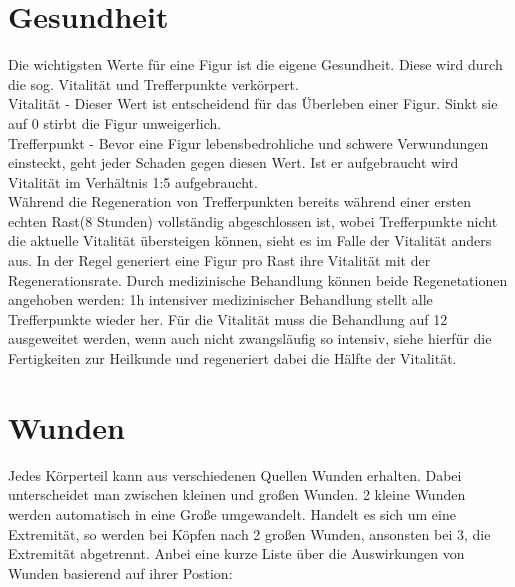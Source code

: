 \documentclass[a4paper,12pt,oneside]{book}
\begin{document}
\section{Gesundheit}
Die wichtigsten Werte für eine Figur ist die eigene Gesundheit. Diese wird durch die sog. Vitalität und Trefferpunkte verkörpert.
\\Vitalität - Dieser Wert ist entscheidend für das Überleben einer Figur. Sinkt sie auf 0 stirbt die Figur unweigerlich.
\\Trefferpunkt - Bevor eine Figur lebensbedrohliche und schwere Verwundungen einsteckt, geht jeder Schaden gegen diesen Wert. Ist er aufgebraucht wird Vitalität im Verhältnis 1:5 aufgebraucht.
\\Während die Regeneration von Trefferpunkten bereits während einer ersten echten Rast(8 Stunden) vollständig abgeschlossen ist, wobei Trefferpunkte nicht die aktuelle Vitalität übersteigen können, sieht es im Falle der Vitalität anders aus. In der Regel generiert eine Figur pro Rast ihre Vitalität mit der Regenerationsrate. Durch medizinische Behandlung können beide Regenetationen angehoben werden: 1h intensiver medizinischer Behandlung stellt alle Trefferpunkte wieder her. Für die Vitalität muss die Behandlung auf 12 ausgeweitet werden, wenn auch nicht zwangsläufig so intensiv, siehe hierfür die Fertigkeiten zur Heilkunde und regeneriert dabei die Hälfte der Vitalität.

\section{Wunden}
Jedes Körperteil kann aus verschiedenen Quellen Wunden erhalten. Dabei unterscheidet man zwischen kleinen und großen Wunden. 2 kleine Wunden werden automatisch in eine Große umgewandelt. Handelt es sich um eine Extremität, so werden bei Köpfen nach 2 großen Wunden, ansonsten bei 3, die Extremität abgetrennt. Anbei eine kurze Liste über die Auswirkungen von Wunden basierend auf ihrer Postion:
\end{document}

